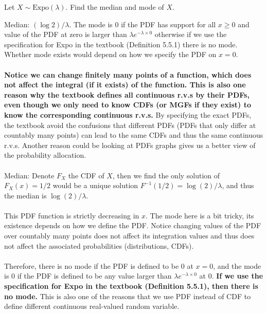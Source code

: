 
\setcounter{theorem}{1}
\begin{exercise} [BH.6.2] Let $X \sim \text{Expo}(\lambda)$. Find the median and mode of $X$.

\begin{solution}
    Median: $(\log2)/\lambda$. The mode is 0 if the PDF has support for all $x\geq 0$ and value of the PDF at zero is larger than $\lambda e^{-\lambda \times 0}$ otherwise if we use the specification for Expo in the textbook (Definition 5.5.1) there is no mode. 
	Whether mode exists would depend on how we specify the PDF on $x=0$.\\~\\
    \textbf{Notice we can change finitely 
		many points of a function, which does not affect the integral (if it exists) of the function. This is also one reason why the textbook defines all continuous r.v.s by their PDFs, even though we only need to know CDFs (or MGFs if they exist) to know the corresponding continuous r.v.s.} By specifying the exact PDFs, the textbook avoid the confusions that different PDFs (PDFs that only differ at countably many points) can lead to the same CDFs and thus the same continuous r.v.s. Another reason could be looking at PDFs graphs gives us a better view of the probability  allocation.  
	\\~\\
	Median: Denote $F_X$ the CDF of $X$, then we find the only solution of $F_X(x)=1/2$ would be a unique solution $F^{-1}(1/2)= \log(2)/\lambda$, and thus 
	the median is $\log(2)/\lambda$.
	~\\~\\
	This PDF function is strictly decreasing in $x$. The mode here is a bit tricky, its existence depends on how we define the PDF. Notice changing values of the PDF over countably many points does not affect its integration values and thus does not affect the associated probabilities (distributions, CDFs).  \\~\\
	Therefore, there is no mode if the PDF is defined to be 0 at $x = 0$, and the mode is 0 if the PDF is defined to be any value larger than $\lambda e^{-\lambda \times 0}$ at 0. \textbf{If we use the specification for Expo in the textbook (Definition 5.5.1), then there is no mode.} This is also one of the reasons that we use PDF instead of CDF to define different continuous real-valued random variable.  \\
	

\end{solution}
\end{exercise}
